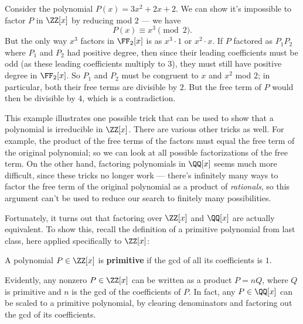 \begin{example}\label{no factorization}
Consider the polynomial $P(x) = 3x^2 + 2x + 2$. We can show it's impossible to factor $P$ in $\ZZ[x]$ by reducing mod $2$ --- we have \[P(x) \equiv x^3 \pmod{2}.\] But the only way $x^3$ factors in $\FF_2[x]$ is as $x^3\cdot 1$ or $x^2\cdot x$. If $P$ factored as $P_1P_2$ where $P_1$ and $P_2$ had positive degree, then since their leading coefficients must be odd (as these leading coefficients multiply to $3$), they must still have positive degree in $\FF_2[x]$. So $P_1$ and $P_2$ must be congruent to $x$ and $x^2$ mod $2$; in particular, both their free terms are divisible by $2$. But the free term of $P$ would then be divisible by $4$, which is a contradiction. 

\end{example}

This example illustrates one possible trick that can be used to show that a polynomial is irreducible in $\ZZ[x]$. There are various other tricks as well. For example, the product of the free terms of the factors must equal the free term of the original polynomial; so we can look at all possible factorizations of the free term. On the other hand, factoring polynomials in $\QQ[x]$ seems much more difficult, since these tricks no longer work --- there's infinitely many ways to factor the free term of the original polynomial as a product of \emph{rationals}, so this argument can't be used to reduce our search to finitely many possibilities. 

Fortunately, it turns out that factoring over $\ZZ[x]$ and $\QQ[x]$ are actually equivalent. To show this, recall the definition of a primitive polynomial from last class, here applied specifically to $\ZZ[x]$:

\begin{definition}
A polynomial $P \in \ZZ[x]$ is \textbf{primitive} if the gcd of all its coefficients is $1$. 
\end{definition}

Evidently, any nonzero $P \in \ZZ[x]$ can be written as a product $P = nQ$, where $Q$ is primitive and $n$ is the gcd of the coefficients of $P$. In fact, any $P \in \QQ[x]$ can be scaled to a primitive polynomial, by clearing denominators and factoring out the gcd of its coefficients. 

